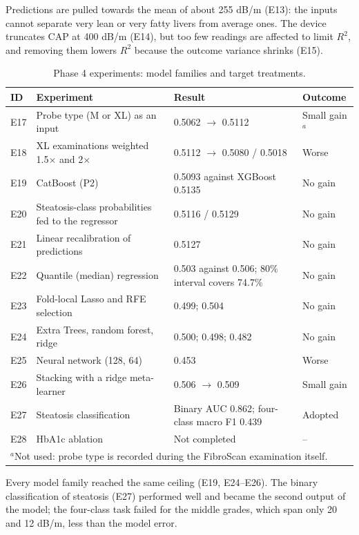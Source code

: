 Predictions are pulled towards the mean of about 255 dB/m (E13): the inputs
cannot separate very lean or very fatty livers from average ones. The device
truncates CAP at 400 dB/m (E14), but too few readings are affected to limit
$R^2$, and removing them lowers $R^2$ because the outcome variance shrinks
(E15).

\begin{table}[htbp]
\centering
\caption{Phase 4 experiments: model families and target treatments.}
\label{tab:exp_p4}
\begin{tabular}{p{0.8cm}p{4.2cm}p{5.2cm}p{1.8cm}}
\toprule
ID & Experiment & Result & Outcome \\
\midrule
E17 & Probe type (M or XL) as an input & 0.5062 $\rightarrow$ 0.5112 & Small gain$^{a}$ \\
E18 & XL examinations weighted 1.5$\times$ and 2$\times$ & 0.5112 $\rightarrow$ 0.5080 / 0.5018 & Worse \\
E19 & CatBoost (P2) & 0.5093 against XGBoost 0.5135 & No gain \\
E20 & Steatosis-class probabilities fed to the regressor & 0.5116 / 0.5129 & No gain \\
E21 & Linear recalibration of predictions & 0.5127 & No gain \\
E22 & Quantile (median) regression & 0.503 against 0.506; 80\% interval covers 74.7\% & No gain \\
E23 & Fold-local Lasso and RFE selection & 0.499; 0.504 & No gain \\
E24 & Extra Trees, random forest, ridge & 0.500; 0.498; 0.482 & No gain \\
E25 & Neural network (128, 64) & 0.453 & Worse \\
E26 & Stacking with a ridge meta-learner & 0.506 $\rightarrow$ 0.509 & Small gain \\
E27 & Steatosis classification & Binary AUC 0.862; four-class macro F1 0.439 & Adopted \\
E28 & HbA1c ablation & Not completed & -- \\
\bottomrule
\multicolumn{4}{l}{\small $^{a}$Not used: probe type is recorded during the FibroScan examination itself.}
\end{tabular}
\end{table}

Every model family reached the same ceiling (E19, E24--E26). The binary
classification of steatosis (E27) performed well and became the second output
of the model; the four-class task failed for the middle grades, which span
only 20 and 12 dB/m, less than the model error.

